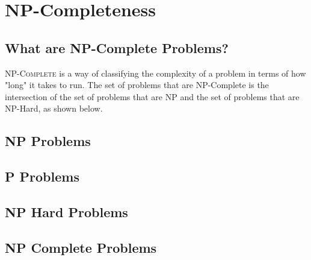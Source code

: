 \chapter{NP-Completeness}
\section{What are NP-Complete Problems?}
\lettrine[lines=4]{N}{P-Complete} is a way of classifying the complexity of a problem in terms of how "long" it takes to run. The set of problems that are NP-Complete is the intersection of the set of problems that are NP and the set of problems that are NP-Hard, as shown below.

\section{NP Problems}

\section{P Problems}

\section{NP Hard Problems}

\section{NP Complete Problems}
